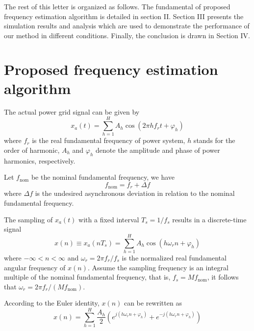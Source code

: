 \documentclass[journal,twoside]{IEEEtran}
\begin{document}
The rest of this letter is organized as follows. The fundamental of proposed frequency estimation algorithm is detailed in section II. Section III presents the simulation results and analysis which are used to demonstrate the performance of our method in different conditions. Finally, the conclusion is drawn in Section IV.
\section{Proposed frequency estimation algorithm}
The actual power grid signal can be given by
\begin{equation}
x_a(t)=\sum_{h=1}^{H}A_h\cos(2\pi hf_rt+\varphi_h)\label{eqn_1}
\end{equation}
where $f_r$ is the real fundamental frequency of power system, $h$ stands for the order of harmonic, $A_h$ and $\varphi_h$ denote the amplitude and phase of power harmonics, respectively.

Let $f_\mathrm{nom}$ be the nominal fundamental frequency, we have
\begin{equation}
f_\mathrm{nom}=f_r+\Delta f\label{eqn_2}
\end{equation}
where $\Delta f$ is the undesired asynchronous deviation in relation to the nominal fundamental frequency.

The sampling of $x_a(t)$ with a fixed interval $T_s=1/f_s$ results in a discrete-time signal
\begin{equation}
x(n)\equiv x_a(nT_s)=\sum_{h=1}^{H}A_h\cos (h\omega_r n+\varphi_h)\label{eqn_3}
\end{equation}
where $-\infty<n<\infty$ and $\omega_r=2\pi f_r/f_s$ is the normalized real fundamental angular frequency of $x(n)$. Assume the sampling frequency is an integral multiple of the nominal fundamental frequency, that is, $f_s=Mf_\mathrm{nom}$, it follows that $\omega_r=2\pi f_r/(Mf_\mathrm{nom})$.

According to the Euler identity, $x(n)$ can be rewritten as
\begin{equation}
x(n)=\sum_{h=1}^{H}\dfrac{A_h}{2}\left(e^{j\left(h\omega_r n+\varphi_h\right)}+e^{-j\left(h\omega_r n+\varphi_h\right)}\right)\label{eqn_4}
\end{equation}
\end{document}
